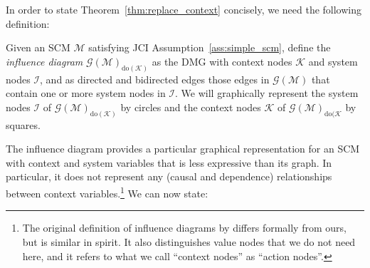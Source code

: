 \documentclass[twoside,11pt]{article}
\newcommand\C[1]{\mathcal{#1}}
\newcommand{\intervene}{\mathrm{do}}
\begin{document}
In order to state Theorem~\ref{thm:replace_context} concisely, we need the following definition:
\begin{definition}
Given an SCM $\C{M}$ satisfying JCI Assumption~\ref{ass:simple_scm}, define the \emph{influence diagram}
$\C{G}(\C{M})_{\intervene(\C{K})}$ as the DMG with context nodes $\C{K}$ and system nodes $\C{I}$, 
and as directed and bidirected edges those edges in $\C{G}(\C{M})$ that
contain one or more system nodes in $\C{I}$.
We will graphically represent the system nodes $\C{I}$ of $\C{G}(\C{M})_{\intervene(\C{K})}$
by circles and the context nodes $\C{K}$ of $\C{G}(\C{M})_{\intervene(\C{K}}$ by squares.
\end{definition}
The influence diagram provides a particular graphical representation
for an SCM with context and system variables that is less expressive than its
graph. In particular, it does not represent any (causal and dependence) relationships 
between context variables.\footnote{The original definition of influence diagrams by \citep{HowardMatheson2005}
differs formally from ours, but is similar in spirit. It also distinguishes value nodes that we do not need here, and
it refers to what we call ``context nodes'' as ``action nodes''.}
We can now state:
\end{document}
